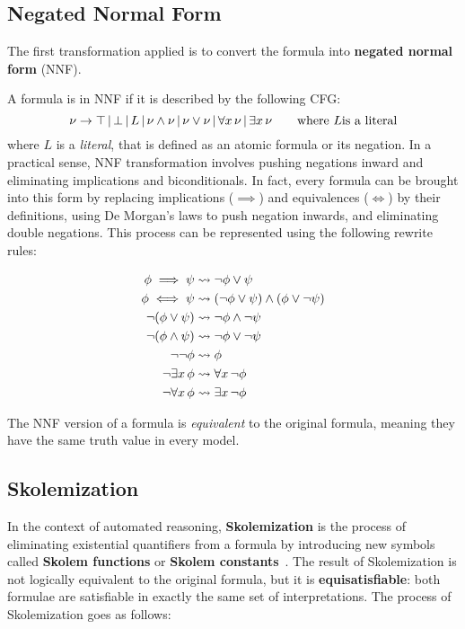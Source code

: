 \subsection{Negated Normal Form}
The first transformation applied is to convert the formula into \textbf{negated normal form} (NNF).

A formula is in NNF if it is described by the following CFG\@:
\begin{equation}
  \nu \to \top  \, | \,  \bot  \, | \,  L  \, | \,  \nu \land \nu  \, | \,  \nu \lor \nu  \, | \,  \forall x  \,  \nu  \, | \,  \exists x  \,  \nu \quad\quad \text{where } L \text{is a literal}
\end{equation}
where \(L\) is a \emph{literal}, that is defined as an atomic formula or its negation.
In a practical sense, NNF transformation involves pushing negations inward and eliminating implications and biconditionals.
In fact, every formula can be brought into this form by replacing implications (\(\implies\)) and equivalences (\(\iff\)) by their definitions, using De Morgan's laws to push negation inwards, and eliminating double negations. This process can be represented using the following rewrite rules:

\begin{equation}
  \begin{aligned}
    \phi \implies \psi &\leadsto \neg \phi \lor \psi \\
    \phi \iff \psi &\leadsto (\neg \phi \lor \psi) \land (\phi \lor \neg \psi) \\
    \neg (\phi \lor \psi) &\leadsto \neg \phi \land \neg \psi \\
    \neg (\phi \land \psi) &\leadsto \neg \phi \lor \neg \psi \\
    \neg \neg \phi &\leadsto \phi \\
    \neg \exists x  \,  \phi &\leadsto \forall x  \,  \neg \phi \\
    \neg \forall x  \,  \phi &\leadsto \exists x  \,  \neg \phi
  \end{aligned}
\end{equation}

The NNF version of a formula is \emph{equivalent} to the original formula, meaning they have the same truth value in every model.

\subsection{Skolemization}
In the context of automated reasoning, \textbf{Skolemization} is the process of eliminating existential quantifiers from a formula by introducing new symbols called \textbf{Skolem functions} or \textbf{Skolem constants}~\cite{skolem1920}.  
The result of Skolemization is not logically equivalent to the original formula, but it is \textbf{equisatisfiable}: both formulae are satisfiable in exactly the same set of interpretations.
The process of Skolemization goes as follows:

